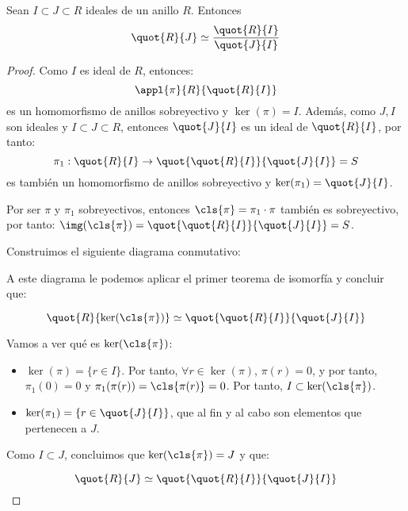 
\begin{theorem} \label{thm:IsomorfiaAnillos2} Sean $I ⊂ J ⊂ R$ ideales de un anillo $R$. Entonces \[ \quot{R}{J} \simeq \frac{\quot{R}{I}}{\quot{J}{I}} \]
\end{theorem}

\begin{proof}

Como $I$ es ideal de $R$, entonces:
\[ \appl{\pi}{R}{\quot{R}{I}} \]
es un homomorfismo de anillos sobreyectivo y $\ker(\pi)=I$. Además, como $J,I$ son ideales y $I\subset J \subset R$, entonces $\quot{J}{I}$ es un ideal de $\quot{R}{I}$, por tanto:
\[
	\pi_1: \quot{R}{I} \rightarrow \quot{\quot{R}{I}}{\quot{J}{I}}=S
\]
es también un homomorfismo de anillos sobreyectivo y $\ker(\pi_1)=\quot{J}{I}$.

Por ser $\pi$ y $\pi_1$ sobreyectivos, entonces $\cls{\pi}=\pi_1\cdot\pi$ también es sobreyectivo, por tanto: $\img(\cls{\pi})=\quot{\quot{R}{I}}{\quot{J}{I}}=S$.

Construimos el siguiente diagrama conmutativo:

\begin{center}
\end{center}

A este diagrama le podemos aplicar el primer teorema de isomorfía y concluir que:

$$ \quot{R}{\ker(\cls{\pi})} \simeq  \quot{\quot{R}{I}}{\quot{J}{I}} $$

Vamos a ver qué es $\ker(\cls{\pi})$:

\begin{itemize}
	\item $\ker(\pi)=\{r \in I\}$. Por tanto, $\forall r \in \ker(\pi)$, $\pi(r)=0$, y por tanto, $\pi_1(0)=0$ y $\pi_1(\pi(r))=\cls{\pi(r)}=0$. Por tanto, $I \subset \ker(\cls{\pi})$.
	\item $\ker(\pi_1)=\{ r \in \quot{J}{I}\}$, que al fin y al cabo son elementos que pertenecen a $J$.
\end{itemize}

Como $I \subset J$, concluimos que $\ker(\cls{\pi}) = J$ y que:

$$ \quot{R}{J} \simeq  \quot{\quot{R}{I}}{\quot{J}{I}} $$

\end{proof}

